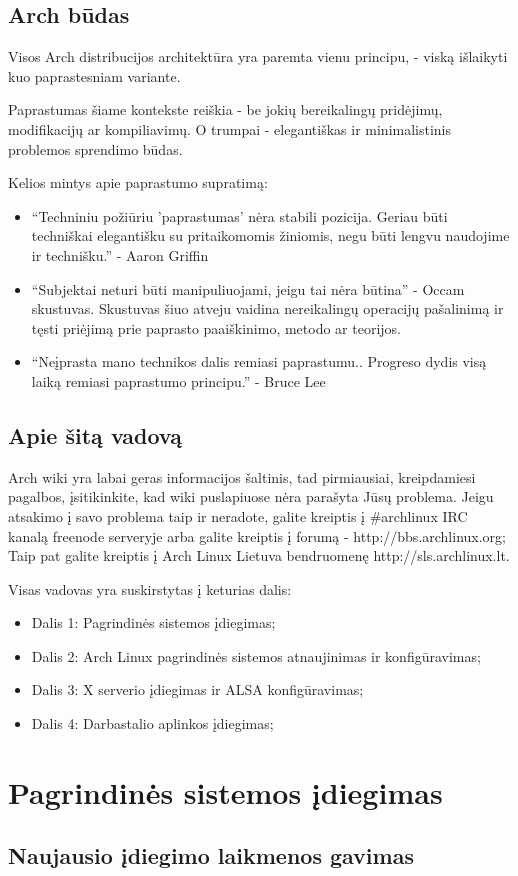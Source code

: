 \documentclass[a4paper]{book}
\begin{document}
  \section{Arch būdas}
  
  Visos Arch distribucijos architektūra yra paremta vienu principu, -
  viską išlaikyti kuo paprastesniam variante.

  Paprastumas šiame kontekste reiškia - be jokių bereikalingų
  pridėjimų, modifikacijų ar kompiliavimų. O trumpai - elegantiškas
  ir minimalistinis problemos sprendimo būdas.

  Kelios mintys apie paprastumo supratimą:
  \begin{itemize}
    \item ``Techniniu požiūriu 'paprastumas' nėra stabili
      pozicija. Geriau būti techniškai elegantišku su pritaikomomis
      žiniomis, negu būti lengvu naudojime ir technišku.'' - Aaron
      Griffin
    \item ``Subjektai neturi būti manipuliuojami, jeigu tai nėra
      būtina'' - Occam skustuvas. Skustuvas šiuo atveju vaidina
      nereikalingų operacijų pašalinimą ir tęsti priėjimą prie
      paprasto paaiškinimo, metodo ar teorijos.
    \item ``Neįprasta mano technikos dalis remiasi
      paprastumu.. Progreso dydis visą laiką remiasi paprastumo principu.'' - Bruce Lee
  \end{itemize}

  \section{Apie šitą vadovą}

    Arch wiki yra labai geras informacijos šaltinis, tad pirmiausiai,
    kreipdamiesi pagalbos, įsitikinkite, kad wiki puslapiuose nėra
    parašyta Jūsų problema. Jeigu atsakimo į savo problema taip ir neradote, galite
    kreiptis į $\#$archlinux IRC kanalą freenode serveryje arba galite
    kreiptis į forumą - http://bbs.archlinux.org; Taip pat galite
    kreiptis į Arch Linux Lietuva bendruomenę http://sls.archlinux.lt.

    Visas vadovas yra suskirstytas į keturias dalis:
    \begin{itemize}
      \item Dalis 1: Pagrindinės sistemos įdiegimas;
      \item Dalis 2: Arch Linux pagrindinės sistemos atnaujinimas ir
        konfigūravimas;
      \item Dalis 3: X serverio įdiegimas ir ALSA konfigūravimas;
      \item Dalis 4: Darbastalio aplinkos įdiegimas;
    \end{itemize}

\chapter{Pagrindinės sistemos įdiegimas}
  \section{Naujausio įdiegimo laikmenos gavimas}
\end{document}
